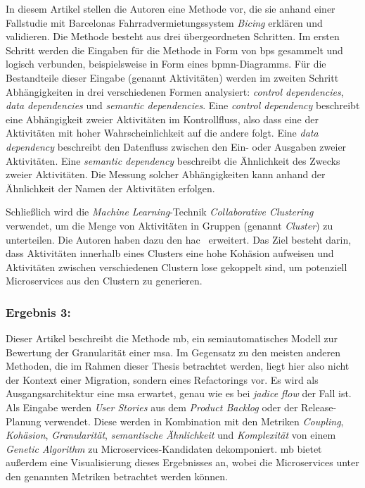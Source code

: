 In diesem Artikel stellen die Autoren eine Methode vor, die sie anhand einer Fallstudie mit Barcelonas Fahrradvermietungssystem \emph{Bicing} erklären und validieren.
Die Methode besteht aus drei übergeordneten Schritten.
Im ersten Schritt werden die Eingaben für die Methode in Form von \glspl{bp} gesammelt und logisch verbunden, beispielsweise in Form eines \gls{bpmn}-Diagramms.
Für die Bestandteile dieser Eingabe (genannt Aktivitäten) werden im zweiten Schritt Abhängigkeiten in drei verschiedenen Formen analysiert: \emph{control dependencies}, \emph{data dependencies} und \emph{semantic dependencies}.
Eine \emph{control dependency} beschreibt eine Abhängigkeit zweier Aktivitäten im Kontrollfluss, also dass eine der Aktivitäten mit hoher Wahrscheinlichkeit auf die andere folgt.
Eine \emph{data dependency} beschreibt den Datenfluss zwischen den Ein- oder Ausgaben zweier Aktivitäten.
Eine \emph{semantic dependency} beschreibt die Ähnlichkeit des Zwecks zweier Aktivitäten.
Die Messung solcher Abhängigkeiten kann anhand der Ähnlichkeit der Namen der Aktivitäten erfolgen.

Schließlich wird die \emph{Machine Learning}-Technik \emph{Collaborative Clustering} verwendet, um die Menge von Aktivitäten in Gruppen (genannt \emph{Cluster}) zu unterteilen.
Die Autoren haben dazu den \gls{hac}~\cite{hierarchical-agglomerative-algorithm} erweitert.
Das Ziel besteht darin, dass Aktivitäten innerhalb eines Clusters eine hohe Kohäsion aufweisen und Aktivitäten zwischen verschiedenen Clustern lose gekoppelt sind, um potenziell Microservices aus den Clustern zu generieren.


\subsubsection{Ergebnis 3:  \cite{arh-result-no-filter-2}}

Dieser Artikel beschreibt die Methode \gls{mb}, ein semiautomatisches Modell zur Bewertung der Granularität einer \gls{msa}.
Im Gegensatz zu den meisten anderen Methoden, die im Rahmen dieser Thesis betrachtet werden, liegt hier also nicht der Kontext einer Migration, sondern eines Refactorings vor.
Es wird als Ausgangsarchitektur eine \gls{msa} erwartet, genau wie es bei \emph{jadice flow} der Fall ist.
Als Eingabe werden \emph{User Stories} aus dem \emph{Product Backlog} oder der Release-Planung verwendet.
Diese werden in Kombination mit den Metriken \emph{Coupling}, \emph{Kohäsion}, \emph{Granularität}, \emph{semantische Ähnlichkeit} und \emph{Komplexität} von einem \emph{Genetic Algorithm} zu Microservices-Kandidaten dekomponiert.
\gls{mb} bietet außerdem eine Visualisierung dieses Ergebnisses an, wobei die Microservices unter den genannten Metriken betrachtet werden können.

